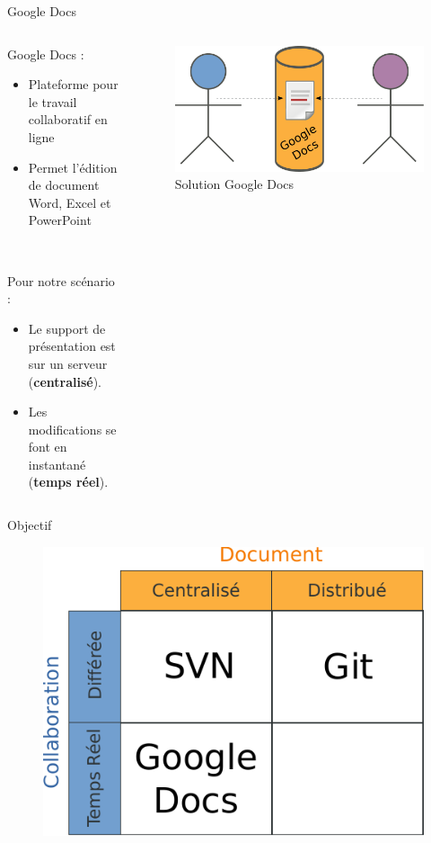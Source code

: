 \begin{frame}{Google Docs}
\begin{columns}
  \begin{column}{.5\textwidth}
  Google Docs :
  \begin{itemize}
    \item Plateforme pour le travail collaboratif en ligne
    \item Permet l'édition de document Word, Excel et PowerPoint
  \end{itemize}~

  Pour notre scénario :
  \begin{itemize}
    \item Le support de présentation est sur un serveur (\textbf{centralisé}).
    \item Les modifications se font en instantané (\textbf{temps réel}).
  \end{itemize}
  \end{column}

  \begin{column}{.45\textwidth}
  \begin{figure}
    \center
    \includegraphics[width=.9\textwidth]{includes/gdocs.pdf}
    \caption{Solution Google Docs}
  \end{figure}
  \end{column}
\end{columns}
\end{frame}

\begin{frame}{Objectif}
  \begin{figure}
    \center
    \includegraphics[width=.7\textwidth]{includes/tab1.pdf}
  \end{figure}
\end{frame}

